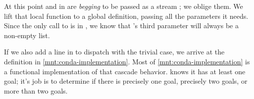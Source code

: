 \documentclass[runningheads,natbib=false]{llncs}
\begin{document}
At this point  and  in 
are \emph{begging} to be passed as a stream ; we oblige
them. We lift that local function  to a global
definition, passing all the parameters it needs. Since the only call
to  is in , we know that
's third parameter will always be a non-empty list.



If we also add a line in  to dispatch with the
trivial case, we arrive at the definition in
\cref{mnt:conda-implementation}. Most of
\cref{mnt:conda-implementation} is a functional implementation of that
cascade behavior.  knows it has at least one goal; it's
job is to determine if there is precisely one goal, precisely two
goals, or more than two goals.
\end{document}
